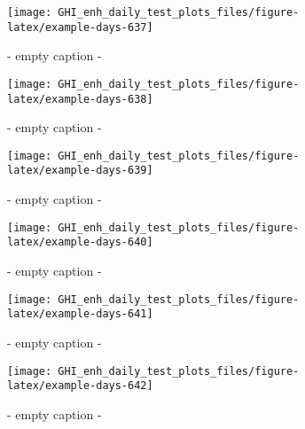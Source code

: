 \documentclass[
  10pt,
  a4paper,oneside]{article}
\begin{document}
\begin{figure}[H]

{\centering \texttt{[image: GHI\_enh\_daily\_test\_plots\_files/figure-latex/example-days-637]} 

}

\caption{ - empty caption - }\label{fig:example-days-637}
\end{figure}

\begin{figure}[H]

{\centering \texttt{[image: GHI\_enh\_daily\_test\_plots\_files/figure-latex/example-days-638]} 

}

\caption{ - empty caption - }\label{fig:example-days-638}
\end{figure}

\begin{figure}[H]

{\centering \texttt{[image: GHI\_enh\_daily\_test\_plots\_files/figure-latex/example-days-639]} 

}

\caption{ - empty caption - }\label{fig:example-days-639}
\end{figure}

\begin{figure}[H]

{\centering \texttt{[image: GHI\_enh\_daily\_test\_plots\_files/figure-latex/example-days-640]} 

}

\caption{ - empty caption - }\label{fig:example-days-640}
\end{figure}

\begin{figure}[H]

{\centering \texttt{[image: GHI\_enh\_daily\_test\_plots\_files/figure-latex/example-days-641]} 

}

\caption{ - empty caption - }\label{fig:example-days-641}
\end{figure}

\begin{figure}[H]

{\centering \texttt{[image: GHI\_enh\_daily\_test\_plots\_files/figure-latex/example-days-642]} 

}

\caption{ - empty caption - }\label{fig:example-days-642}
\end{figure}
\end{document}

